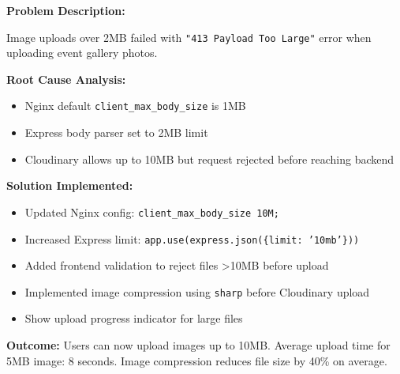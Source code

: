 \documentclass[12pt,a4paper]{article}
\begin{document}
\begin{tcolorbox}[colback=LightTeal, colframe=Teal, title=\textbf{Challenge 10: Large File Upload Failures for Event Galleries}, fonttitle=\bfseries]

\textbf{Problem Description:}

Image uploads over 2MB failed with \texttt{"413 Payload Too Large"} error when uploading event gallery photos.

\textbf{Root Cause Analysis:}
\begin{itemize}[noitemsep]
  \item Nginx default \texttt{client\_max\_body\_size} is 1MB
  \item Express body parser set to 2MB limit
  \item Cloudinary allows up to 10MB but request rejected before reaching backend
\end{itemize}

\textbf{Solution Implemented:}
\begin{itemize}[noitemsep]
  \item Updated Nginx config: \texttt{client\_max\_body\_size 10M;}
  \item Increased Express limit: \texttt{app.use(express.json(\{limit: '10mb'\}))}
  \item Added frontend validation to reject files >10MB before upload
  \item Implemented image compression using \texttt{sharp} before Cloudinary upload
  \item Show upload progress indicator for large files
\end{itemize}

\textbf{Outcome:} Users can now upload images up to 10MB. Average upload time for 5MB image: 8 seconds. Image compression reduces file size by 40\% on average.
\end{tcolorbox}

\vspace{8pt}
\end{document}
